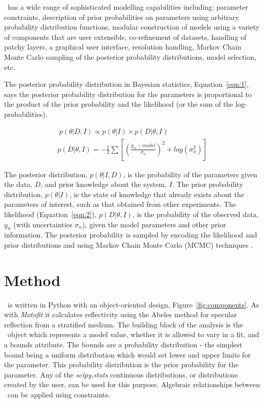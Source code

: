 \documentclass[12pt]{article}
\begin{document}
\ has a wide range of sophisticated modelling capabilities including: parameter constraints, description of prior probabilities on parameters using arbitrary probability distribution functions, modular construction of models using a variety of components that are user extensible, co-refinement of datasets, handling of patchy layers, a graphical user interface, resolution handling, Markov Chain Monte Carlo sampling of the posterior probability distributions, model selection, etc.

The posterior probability distribution in Bayesian statistics, Equation~\ref{eqn:1}, says the posterior probability distribution for the parameters is proportional to the product of the prior probability and the likelihood (or the sum of the log-probabilities).

\begin{gather} 
\label{eqn:1}\ p(\theta | D, I) \propto p(\theta | I)\times p(D | \theta, I)\\
p(D | \theta, I) = -\frac{1}{2} \sum [(\frac{y_n - model} {\sigma_n})^2 + log(\sigma_n^2)]\label{eqn:2}
\end{gather}

The posterior distribution, $p(\theta | I, D)$, is the probability of the parameters given the data, $D$, and prior knowledge about the system, $I$. 
The prior probability distribution, $p(\theta | I)$, is the state of knowledge that already exists about the parameters of interest, such as that obtained from other experiments.
The likelihood (Equation~\ref{eqn:2}), $p(D | \theta, I)$, is the probability of the observed data, $y_n$ (with uncertainties $\sigma_n$), given the model parameters and other prior information.  The posterior probability is sampled by encoding the likelihood and prior distributions and using Markov Chain Monte Carlo (MCMC) techniques \cite{emcee}.

\section*{Method}
\ is written in Python with an object-oriented design, Figure~\ref{fig:components}. As with \emph{Motofit} \cite{Nelson2006} it calculates reflectivity using the Abeles method \cite{Heavens1955} for specular reflection from a stratified medium.
The building block of the analysis is the \Parameter\ object which represents a model value, whether it is allowed to vary in a fit, and a bounds attribute. The bounds are a probability distribution - the simplest bound being a uniform distribution which would set lower and upper limits for the parameter. This probability distribution is the prior probability for the parameter. Any of the \emph{scipy.stats} \cite{Jones2001-2017} continuous distributions, or distributions created by the user, can be used for this purpose. Algebraic relationships between \Parameter\ can be applied using constraints.
\end{document}

